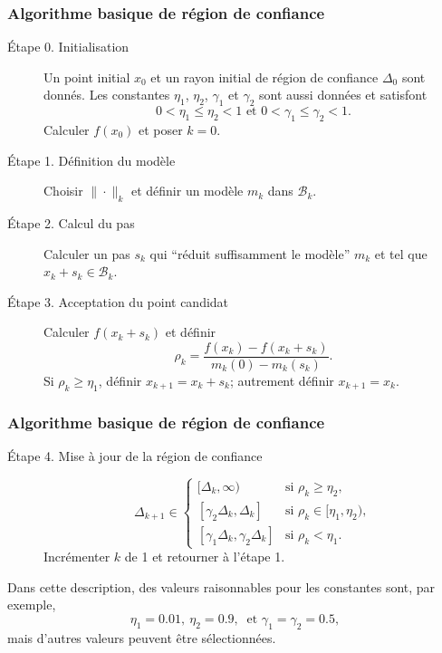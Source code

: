 \documentclass[t,usepdftitle=false]{beamer}
\newenvironment{algo}[1]{
	\refstepcounter{algo}%
	\addcontentsline{lma}{algo}{\protect\numberline{\thealgo}#1}%
	\skipbefore%
	\begin{breakbox}
		\par\noindent%
		\ifthenelse{\equal{#1}{}}{\textbf{\algoname\ \thealgo}}%
		{\textbf{\algoname\ \thealgo:} #1}
	}
	{
	\end{breakbox}
	\skipafterbox
}
\begin{document}
\begin{frame}
\frametitle{Algorithme basique de région de confiance}

\begin{description}
\item[Étape 0. Initialisation]
Un point initial $x_0$ et un rayon initial de région de confiance $\Delta_0$ sont donnés.
Les constantes $\eta_1$, $\eta_2$, $\gamma_1$ et $\gamma_2$ sont aussi données et satisfont
$$
0 < \eta_1 \leq \eta_2 < 1 \text{ et } 0 < \gamma_1 \leq \gamma_2 < 1.
$$
Calculer $f(x_0)$ et poser $k = 0$.

\item[Étape 1. Définition du modèle]
Choisir $\|\cdot\|_k$ et définir un modèle $m_k$ dans $\mathcal{B}_k$.

\item[Étape 2. Calcul du pas]

Calculer un pas $s_k$ qui ``réduit suffisamment le modèle'' $m_k$ et tel que $x_k + s_k \in \mathcal{B}_k$.

\item[Étape 3. Acceptation du point candidat]
Calculer $f(x_k+s_k)$ et définir
\begin{equation}
\rho_k = \frac{f(x_k)-f(x_k+s_k)}{m_k(0)-m_k(s_k)}.
\label{eq:rhok}
\end{equation}
Si $\rho_k \geq \eta_1$, définir $x_{k+1} = x_k+s_k$; autrement définir $x_{k+1} = x_k$.
\end{description}

\end{frame}

\begin{frame}
\frametitle{Algorithme basique de région de confiance}

\begin{description}
\item[Étape 4. Mise à jour de la région de confiance]
		\[
		\Delta_{k+1} \in \begin{cases}
		[\Delta_k, \infty) & \text{si } \rho_k \geq \eta_2,\\
		[\gamma_2\Delta_k, \Delta_k] & \text{si } \rho_k \in [ \eta_1, \eta_2), \\
		[\gamma_1\Delta_k, \gamma_2\Delta_k] & \text{si } \rho_k < \eta_1.
		\end{cases}
		\]
Incrémenter $k$ de 1 et retourner à l'étape 1.
\end{description}

\mbox{}

Dans cette description, des valeurs raisonnables pour les constantes sont, par exemple,
\[
\eta_1 = 0.01,\ \eta_2 = 0.9,\ \text{ et } \gamma_1 = \gamma_2 = 0.5,
\]
mais d'autres valeurs peuvent être sélectionnées.

\end{frame}
\end{document}
